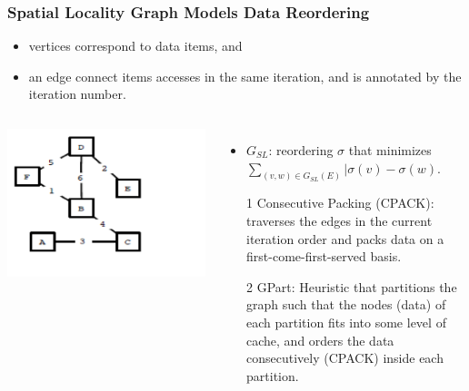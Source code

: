 \documentclass{beamer}
\newcommand{\emp}[1]{\textcolor{DikuRed}{ #1}}
\begin{document}
\begin{frame}[fragile,t]
  \frametitle{Spatial Locality Graph Models Data Reordering}

\begin{itemize}
    \item vertices correspond to data items, and 
    \item an edge connect items accesses in the same 
            iteration, and is annotated by the iteration
            number.
\end  {itemize}

\begin{columns}
\includegraphics[width=44ex]{ParTeaserFigs/SpatLocGraph}
\begin{itemize}
\item $G_{SL}$: reordering $\sigma$ that minimizes
        $\sum_{(v,w)\in G_{SL}(E)} |\sigma(v)-\sigma(w)$.
\item[1] \emp{Consecutive Packing (CPACK)}: traverses
            the edges in the current iteration order
            and packs data on a first-come-first-served basis.\smallskip


\item[2] \emp{GPart}: Heuristic that partitions the 
            graph such that the nodes (data) of each partition 
            fits into some level
            of cache, and orders the data consecutively (CPACK) inside
            each partition.
\end{itemize}
\end{columns}

 
\end{frame}
\end{document}
